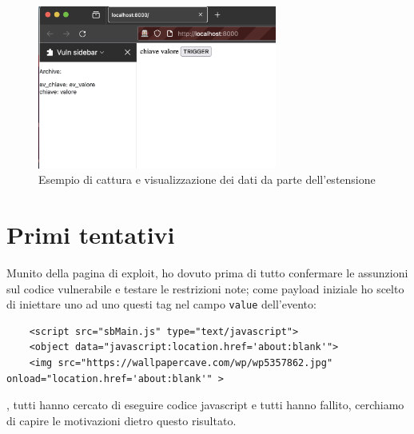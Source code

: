 \documentclass{sapthesis}
\newcommand{\code}[1]{\texttt{#1}}
\begin{document}
        \begin{figure}[ht]
            \centering                                                  
            \includegraphics[width=0.7\textwidth]{sidebar-key-value-example.png}
            \caption{ Esempio di cattura e visualizzazione dei dati da parte dell'estensione }
            \label{fig:sidebar-key-value-example}                             
        \end{figure}

    \section{Primi tentativi}
    \label{sec:attaccando-vuln-tentativi}
        Munito della pagina di exploit, ho dovuto prima di tutto confermare le assunzioni sul
        codice vulnerabile e testare le restrizioni note; come payload iniziale ho scelto
        di iniettare uno ad uno questi tag nel campo \code{value} dell'evento:
        \begin{lstlisting}
    <script src="sbMain.js" type="text/javascript">
    <object data="javascript:location.href='about:blank'">
    <img src="https://wallpapercave.com/wp/wp5357862.jpg" onload="location.href='about:blank'" >
        \end{lstlisting},
        tutti hanno cercato di eseguire codice javascript e tutti hanno fallito, cerchiamo di capire
        le motivazioni dietro questo risultato.
\end{document}

